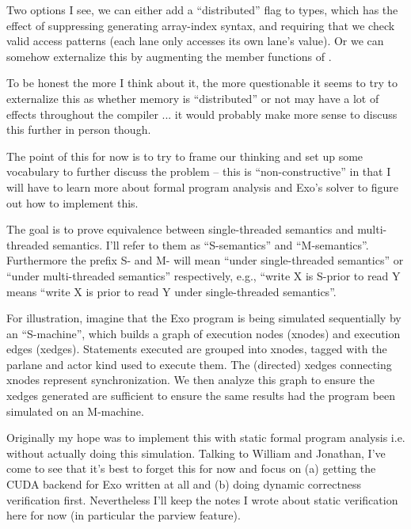 \filbreak
{} Two options I see, we can either add a ``distributed'' flag to  types, which has the effect of suppressing generating array-index syntax, and requiring that we check valid access patterns (each lane only accesses its own lane's value). Or we can somehow externalize this by augmenting the member functions of .

To be honest the more I think about it, the more questionable it seems to try to externalize this as whether memory is ``distributed'' or not may have a lot of effects throughout the compiler ... it would probably make more sense to discuss this further in person though.

\newpage
{}

The point of this for now is to try to frame our thinking and set up some vocabulary to further discuss the problem -- this is ``non-constructive'' in that I will have to learn more about formal program analysis and Exo's solver to figure out how to implement this.

The goal is to prove equivalence between single-threaded semantics and multi-threaded semantics.
I'll refer to them as ``S-semantics'' and ``M-semantics''.
Furthermore the prefix S- and M- will mean ``under single-threaded semantics'' or ``under multi-threaded semantics'' respectively, e.g., ``write X is S-prior to read Y means ``write X is prior to read Y under single-threaded semantics''.

\filbreak
{}

For illustration, imagine that the Exo program is being simulated sequentially by an ``S-machine'', which builds a graph of execution nodes (xnodes) and execution edges (xedges).
Statements executed are grouped into xnodes, tagged with the parlane and actor kind used to execute them.
The (directed) xedges connecting xnodes represent synchronization.
We then analyze this graph to ensure the xedges generated are sufficient to ensure the same results had the program been simulated on an M-machine.

\filbreak
Originally my hope was to implement this with static formal program analysis i.e. without actually doing this simulation.
Talking to William and Jonathan, I've come to see that it's best to forget this for now and focus on (a) getting the CUDA backend for Exo written at all and (b) doing dynamic correctness verification first.
Nevertheless I'll keep the notes I wrote about static verification here for now (in particular the parview feature).

